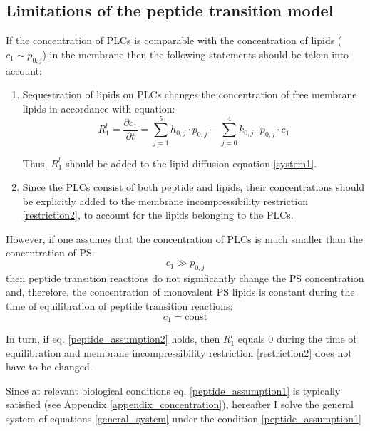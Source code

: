 \subsection{Limitations of the peptide transition model}
\label{CM_peptide_limitations}

If the concentration of PLCs is comparable with the concentration of lipids ($c_1\sim p_{0,j}$) in the membrane then the following statements should be taken into account:
\begin{enumerate}
 \item Sequestration of lipids on PLCs changes the concentration of free membrane lipids in accordance with equation:
\begin{equation}
 \label {er_c1}
 R_1^l=\frac{\partial c_1}{\partial t}=\sum_{j=1}^{5} h_{0,j} \cdot p_{0,j} - \sum_{j=0}^{4} k_{0,j}\cdot p_{0,j} \cdot c_1 
\end{equation}

Thus, $R_1^l$ should be added to the lipid diffusion equation \eqref{system1}.

\item Since the PLCs consist of both peptide and lipids, their concentrations should be explicitly added to the membrane incompressibility restriction \eqref{restriction2}, to account for the lipids belonging to the PLCs.
\end{enumerate}

However, if one assumes that the concentration of PLCs is much smaller than the concentration of PS:
\begin{equation}
 \label{peptide_assumption1}c_1\gg p_{0,j}
\end{equation}
then peptide transition reactions do not significantly change the PS concentration and, therefore, the concentration of monovalent PS lipids is constant during the time of equilibration of peptide transition reactions:
\begin{equation}
 \label{peptide_assumption2}c_1 = \text{const}
\end{equation}

In turn, if eq. \eqref{peptide_assumption2} holds, then $R_1^l$ equals 0 during the time of equilibration and membrane incompressibility restriction \eqref{restriction2} does not have to be changed.

Since at relevant biological conditions eq. \eqref{peptide_assumption1} is typically satisfied (see Appendix \ref{appendix_concentration}), hereafter I solve the general system of equations \eqref{general_system} under the condition \eqref{peptide_assumption1}

